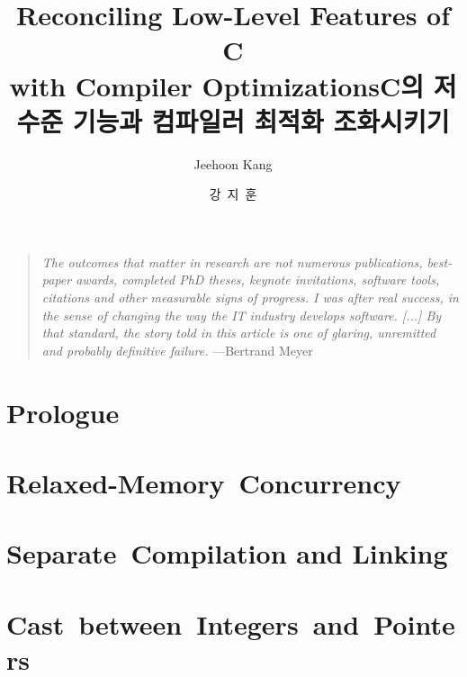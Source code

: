 \documentclass[oneside,phd]{snuthesis}
\title{Reconciling Low-Level Features of C \\ with Compiler Optimizations}
\title*{C의 저수준 기능과 컴파일러 최적화 조화시키기}
\author{Jeehoon Kang}
\author*{강~지~훈} %
\begin{document}
\makefrontcover
\makefrontcover
\makeapproval

\cleardoublepage
{}



\begin{quotation}
  \emph{The outcomes that matter in research are not numerous publications, best-paper awards,
    completed PhD theses, keynote invitations, software tools, citations and other measurable signs
    of progress.  I was after real success, in the sense of changing the way the IT industry
    develops software. [...] By that standard, the story told in this article is one of glaring,
    unremitted and probably definitive failure.} \hfill{}---Bertrand Meyer~\cite{bertrand-meyer}\ \phantom{ }
\end{quotation}



\tableofcontents
\listoffigures

\cleardoublepage
{}


\chapter{Prologue}
\label{chap:prologue}





\chapter{Relaxed-Memory~Concurrency}
\label{chap:relaxed}






% 




\chapter{Separate~Compilation and Linking}
\label{chap:sepcomp}









\chapter{Cast~between~Integers~and~Pointers}
\label{chap:intptrcast}
\end{document}
